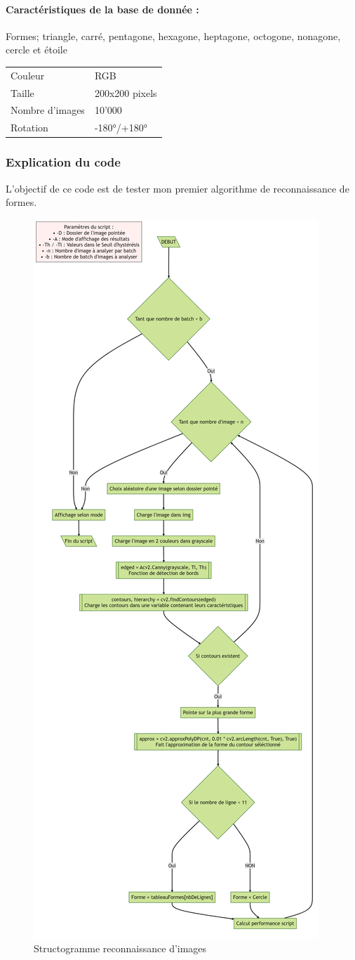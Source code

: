 	\paragraph{Caractéristiques de la base de donnée :}
	
	Formes; triangle, carré, pentagone, hexagone, heptagone, octogone, nonagone, cercle et étoile
	\begin{center}
		\begin{tabular}{l|l}
			Couleur & RGB \\
			Taille & 200x200 pixels \\
			Nombre d'images & 10'000 \\
			Rotation & -180°/+180° \\
		\end{tabular}	
	\end{center}
	\clearpage
	
	\subsubsection{Explication du code}
	L'objectif de ce code est de tester mon premier algorithme de reconnaissance de formes. 
	
	\begin{figure}[!h]
		\centering
		\includegraphics[height=1.2\textwidth]{../Flowcharts/ShapeDetect_B.png}
		\caption{Structogramme reconnaissance d'images}
		\label{fig:structo1}
	\end{figure}
	
